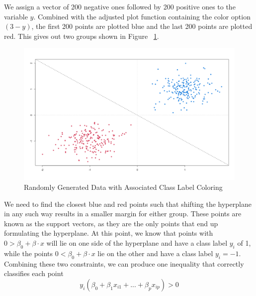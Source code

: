 \documentclass[12pt]{article}
\begin{document}
We assign a vector of 200 negative ones followed by 200 positive ones to the variable $y$. Combined with the adjusted plot function containing the color option $(3-y)$, the first 200 points are plotted blue and the last 200 points are plotted red. This gives out two groups shown in Figure ~\ref{fig_mmc_hyperplane_w_labels}.
\begin{figure}
    \centering
    \includegraphics[width=5.5in]{Figures/mmc/mmc_hyperplane_w_labels.png}
    \caption{Randomly Generated Data with Associated Class Label Coloring}
    \label{fig_mmc_hyperplane_w_labels}
\end{figure}
We need to find the closest blue and red points such that shifting the hyperplane in any such way results in a smaller margin for either group. These points are known as the support vectors, as they are the only points that end up formulating the hyperplane. At this point, we know that points with $0>\beta_0 + \beta \cdot x$ will lie on one side of the hyperplane and have a class label $y_i$ of 1, while the points $0<\beta_0 + \beta \cdot x$ lie on the other and have a class label $y_i=-1$. Combining these two constraints, we can produce one inequality that correctly classifies each point
$$y_i(\beta_0+\beta_1x_{i1}+...+\beta_px_{ip})>0$$
\end{document}
